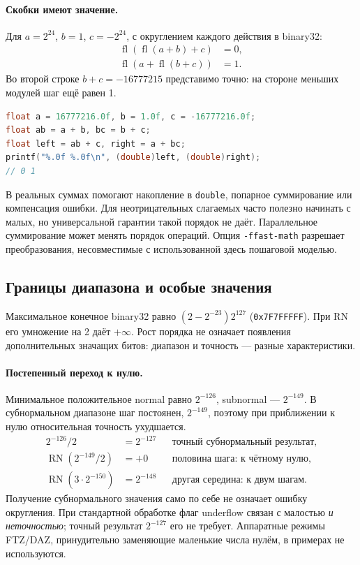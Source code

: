 \paragraph{Скобки имеют значение.}
Для $a=2^{24}$, $b=1$, $c=-2^{24}$, с округлением каждого действия
в binary32:
\[
\begin{aligned}
\operatorname{fl}(\operatorname{fl}(a+b)+c)&=0,\\
\operatorname{fl}(a+\operatorname{fl}(b+c))&=1.
\end{aligned}
\]
Во второй строке $b+c=-16777215$ представимо точно: на стороне
меньших модулей шаг ещё равен 1.
\begin{lstlisting}[language=C,basicstyle=\ttfamily\small]
float a = 16777216.0f, b = 1.0f, c = -16777216.0f;
float ab = a + b, bc = b + c;
float left = ab + c, right = a + bc;
printf("%.0f %.0f\n", (double)left, (double)right);
// 0 1
\end{lstlisting}
В реальных суммах помогают накопление в \texttt{double}, попарное
суммирование или компенсация ошибки. Для неотрицательных слагаемых
часто полезно начинать с малых, но универсальной гарантии такой порядок
не даёт. Параллельное суммирование может менять порядок операций.
Опция \texttt{-ffast-math} разрешает преобразования, несовместимые
с использованной здесь пошаговой моделью.

\subsection{Границы диапазона и особые значения}
Максимальное конечное binary32 равно
$(2-2^{-23})2^{127}$ (\texttt{0x7F7FFFFF}). При RN его умножение на 2
даёт $+\infty$. Рост порядка не означает появления дополнительных
значащих битов: диапазон и точность --- разные характеристики.

\paragraph{Постепенный переход к нулю.}
Минимальное положительное normal равно $2^{-126}$, subnormal --- $2^{-149}$.
В субнормальном диапазоне шаг постоянен, $2^{-149}$, поэтому при
приближении к нулю относительная точность ухудшается.
\[
\begin{aligned}
2^{-126}/2 &= 2^{-127} &&\text{точный субнормальный результат},\\
\operatorname{RN}(2^{-149}/2)&=+0 &&\text{половина шага: к чётному нулю},\\
\operatorname{RN}(3\cdot2^{-150})&=2^{-148} &&\text{другая середина: к двум шагам}.
\end{aligned}
\]
Получение субнормального значения само по себе не означает ошибку
округления. При стандартной обработке флаг underflow связан с малостью
\emph{и неточностью}; точный результат $2^{-127}$ его не требует.
Аппаратные режимы FTZ/DAZ, принудительно заменяющие маленькие числа
нулём, в примерах не используются.

